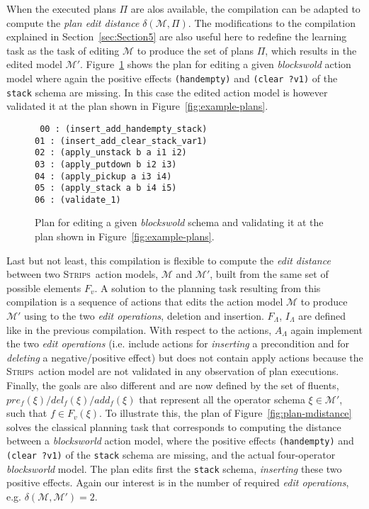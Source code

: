 \documentclass[3p,times]{elsarticle}
\newcommand{\strips}{\textsc{Strips}}     %
\begin{document}
When the executed plans $\Pi$ are alos available, the compilation can be adapted to compute the {\em plan edit distance} $\delta(\mathcal{M},\Pi)$. The modifications to the compilation explained in Section~\ref{sec:Section5} are also useful here to redefine the learning task as the task of editing $\mathcal{M}$ to produce the set of plans $\Pi$, which results in the edited model $\mathcal{M}'$. Figure~\ref{fig:plan-pdistance} shows the plan for editing a given {\em blockswold} action model where again the positive effects {\tt\small (handempty)} and {\tt\small (clear ?v1)} of the {\tt\small stack} schema are missing. In this case the edited action model is however validated it at the plan shown in Figure~\ref{fig:example-plans}.

\begin{figure}[hbt!]
{\tt\small
00 : (insert\_add\_handempty\_stack)\\
01 : (insert\_add\_clear\_stack\_var1)\\
02 : (apply\_unstack b a i1 i2)\\
03 : (apply\_putdown b i2 i3)\\
04 : (apply\_pickup a i3 i4)\\
05 : (apply\_stack a b i4 i5)\\
06 : (validate\_1)
}
 \caption{\small Plan for editing a given {\em blockswold} schema and validating it at the plan shown in Figure~\ref{fig:example-plans}.}
\label{fig:plan-pdistance}
\end{figure}

Last but not least, this compilation is flexible to compute the {\em edit distance} between two \strips\ action models, $\mathcal{M}$ and $\mathcal{M}'$, built from the same set of possible elements $F_v$. A solution to the planning task resulting from this compilation is a sequence of actions that edits the action model $\mathcal{M}$ to produce $\mathcal{M}'$ using to the two {\em edit operations}, deletion and insertion. $F_{\Lambda}$, $I_{\Lambda}$ are defined like in the previous compilation. With respect to the actions, $A_{\Lambda}$ again implement the two {\em edit operations} (i.e. include actions for {\em inserting} a precondition and for {\em deleting} a negative/positive effect) but does not contain apply actions because the \strips\ action model are not validated in any observation of plan executions. Finally, the goals are also different and are now defined by the set of fluents, $pre_f(\xi)/del_f(\xi)/add_f(\xi)$ that represent all the operator schema $\xi\in\mathcal{M'}$, such that $f\in F_v(\xi)$. To illustrate this, the plan of Figure~\ref{fig:plan-mdistance} solves the classical planning task that corresponds to computing the distance between a \emph{blocksworld} action model, where the positive effects {\tt\small (handempty)} and {\tt\small (clear ?v1)} of the {\tt\small stack} schema are missing, and the actual four-operator {\em blocksworld} model. The plan edits first the {\tt\small stack} schema, {\em inserting} these two positive effects. Again our interest is in the number of required {\em edit operations}, e.g. $\delta(\mathcal{M},\mathcal{M'})=2$. 
\end{document}
